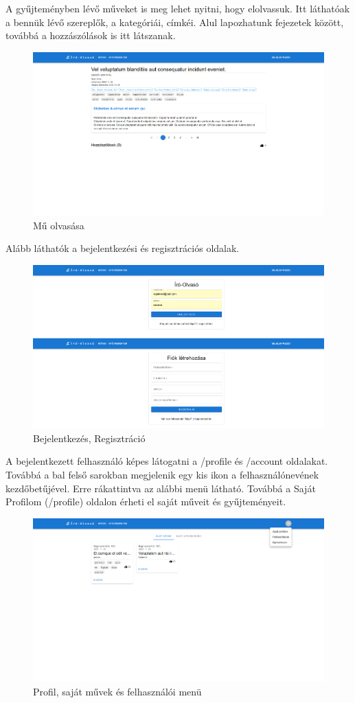 A gyűjteményben lévő műveket is meg lehet nyitni, hogy elolvassuk.
Itt láthatóak a bennük lévő szereplők, a kategóriái, címkéi.
Alul lapozhatunk fejezetek között, továbbá a hozzászólások is itt látszanak.

\begin{figure}[H]
    \centering
    \includegraphics[scale=0.3]{./figures/reader-page.png}
    \caption{Mű olvasása}
    \label{fig:reader-page}
\end{figure}

Alább láthatók a bejelentkezési és regisztrációs oldalak.

\begin{figure}[H]
    \centering
    \includegraphics[scale=0.3]{./figures/login-register.png}
    \caption{Bejelentkezés, Regisztráció}
    \label{fig:login-register}
\end{figure}

A bejelentkezett felhasználó képes látogatni a /profile és /account oldalakat.
Továbbá a bal felső sarokban megjelenik egy kis ikon a felhasználónevének kezdőbetűjével.
Erre rákattintva az alábbi menü látható.
Továbbá a Saját Profilom (/profile) oldalon érheti el saját műveit és gyűjteményeit.

\begin{figure}[H]
    \centering
    \includegraphics[scale=0.3]{./figures/profile-page.png}
    \caption{Profil, saját művek és felhasználói menü}
    \label{fig:profile-page}
\end{figure}